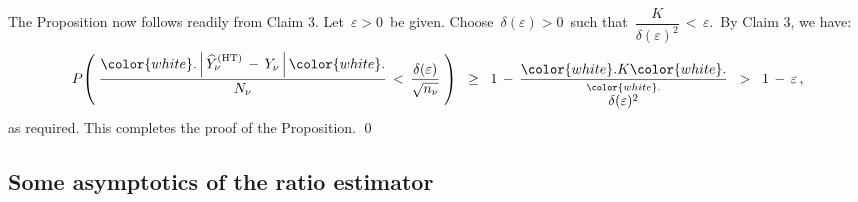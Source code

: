 \vskip 0.5cm
\noindent
The Proposition now follows readily from Claim 3.
Let \,$\varepsilon > 0$\, be given.
Choose \,$\delta(\varepsilon) > 0$\, such that \,$\dfrac{K}{\delta(\varepsilon)^{2}} \,<\, \varepsilon$.\,
By Claim 3, we have:
\begin{equation*}
P\!\left(\;
    \dfrac{
        {\color{white}.}
        \left\vert\,\widehat{Y}^{\textnormal{(HT)}}_{\nu}\,-\,Y_{\nu}\,\right\vert
        {\color{white}.}
        }{
        N_{\nu}
        }
    \,<\,
    \dfrac{\delta(\varepsilon)}{\sqrt{n_{\nu}}}
    \;\right)
\;\; \geq \;\;
    1
    \,-\,
    \dfrac{
        {\color{white}.}
        K
        {\color{white}.}
        }{
        \overset{{\color{white}.}}{\delta(\varepsilon)^{2}}
        }
\;\; > \;\;
    1 \,-\, \varepsilon\,,
\end{equation*}
as required.
This completes the proof of the Proposition.
\qed


\clearpage
\subsection{Some asymptotics of the ratio estimator}



